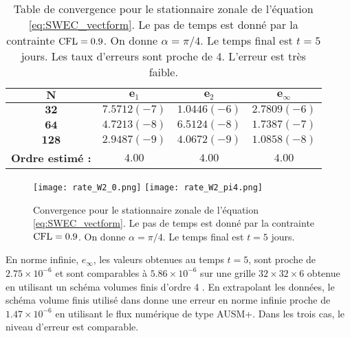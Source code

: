 \begin{table}[htbp]
\begin{center}
\begin{tabular}{|c||c|c|c|}
\hline 
$\mathbf{N}$ & $\mathbf{e}_1$ & $\mathbf{e}_2$ & $\mathbf{e}_{\infty}$ \\ 
\hline 
\hline 
$\mathbf{32}$ & $7.5712(-7)$ & $1.0446(-6)$ & $2.7809(-6)$\\ 

$\mathbf{64}$ & $4.7213(-8)$ & $6.5124(-8)$ & $1.7387(-7)$\\ 

$\mathbf{128}$ & $2.9487(-9)$ & $4.0672(-9)$ & $1.0858(-8)$\\

\hline
\textbf{Ordre estimé :} & $4.00$ & $4.00$ & $4.00$\\ 
\hline
\end{tabular} 
\end{center}
\caption{Table de convergence pour le stationnaire zonale de l'équation \eqref{eq:SWEC_vectform}. Le pas de temps est donné par la contrainte $\text{CFL}=0.9$. On donne $\alpha = \pi/4$. Le temps final est $t=5$ jours. Les taux d'erreurs sont proche de 4. L'erreur est très faible.}
\label{tab:rate_swe2}
\end{table}

\begin{figure}[htbp]
\begin{center}
\texttt{[image: rate\_W2\_0.png]}
\texttt{[image: rate\_W2\_pi4.png]}
\end{center}
\caption{Convergence pour le stationnaire zonale de l'équation \eqref{eq:SWEC_vectform}. Le pas de temps est donné par la contrainte $\text{CFL}=0.9$. On donne $\alpha = \pi/4$. Le temps final est $t=5$ jours.}
\label{fig:rate_swe12}
\end{figure}

En norme infinie, $e_{\infty}$, les valeurs obtenues au temps $t=5$, sont proche de $2.75 \times 10^{-6}$ et sont comparables à $5.86 \times 10^{-6}$ sur une grille $32 \times 32 \times 6$ obtenue en utilisant un schéma volumes finis d'ordre 4 \cite{Chen2008}. En extrapolant les données, le schéma volume finis utilisé dans \cite{Ullrich2011} donne une erreur en norme infinie proche de $1.47 \times 10^{-6}$ en utilisant le flux numérique de type AUSM+. Dans les trois cas, le niveau d'erreur est comparable.

















